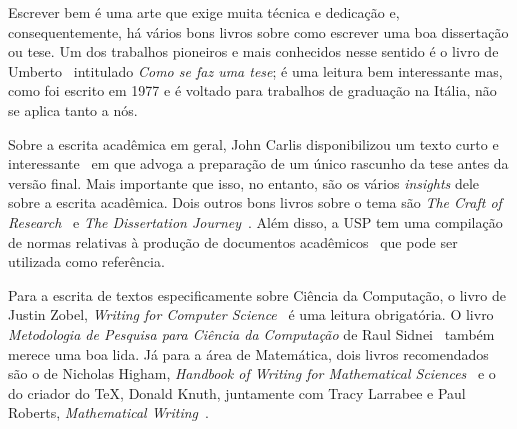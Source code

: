 

\label{cap:introducao}

Escrever bem é uma arte que exige muita técnica e dedicação e,
consequentemente, há vários bons livros sobre como escrever uma boa
dissertação ou tese. Um dos trabalhos pioneiros e mais conhecidos nesse
sentido é o livro de Umberto~\citet{eco:09} intitulado \emph{Como se faz
uma tese}; é uma leitura bem interessante mas, como foi escrito em 1977 e
é voltado para trabalhos de graduação na Itália, não se aplica tanto a nós.

Sobre a escrita acadêmica em geral, John Carlis disponibilizou um texto curto
e interessante~\citep{carlis:09} em que advoga a preparação de um único
rascunho da tese antes da versão final. Mais importante que isso, no
entanto, são os vários \textit{insights} dele sobre a escrita acadêmica.
Dois outros bons livros sobre o tema são \emph{The Craft of Research}~\citep{craftresearch}
e \emph{The Dissertation Journey}~\citep{dissertjourney}. Além disso,
a USP tem uma compilação de normas relativas à produção de documentos
acadêmicos~\citep{usp:guidelines} que pode ser utilizada como referência.

Para a escrita de textos especificamente sobre Ciência da Computação, o
livro de Justin Zobel, \emph{Writing for Computer Science}~\citep{zobel:04}
é uma leitura obrigatória. O livro \emph{Metodologia de Pesquisa para
Ciência da Computação} de Raul Sidnei~\citet{waz:09}
também merece uma boa lida. Já para a área de Matemática, dois livros
recomendados são o de Nicholas Higham, \emph{Handbook of Writing for
Mathematical Sciences}~\citep{Higham:98} e o do criador do \TeX{}, Donald
Knuth, juntamente com Tracy Larrabee e Paul Roberts, \emph{Mathematical
Writing}~\citep{Knuth:96}.

